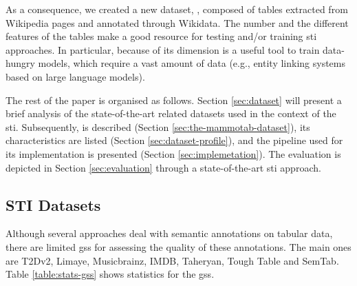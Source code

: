 As a consequence, we created a new dataset, \mammotab, composed of {} tables extracted from {} Wikipedia pages and annotated through Wikidata. The number and the different features of the tables make \mammotab a good resource for testing and/or training \ac{sti} approaches. In particular, because of its dimension \mammotab is a useful tool to train data-hungry models, which require a vast amount of data (e.g., entity linking systems based on large language models).

The rest of the paper is organised as follows. Section \ref{sec:dataset} will present a brief analysis of the state-of-the-art related datasets used in the context of the \ac{sti}. Subsequently, \mammotab is described (Section \ref{sec:the-mammotab-dataset}), its characteristics are listed (Section \ref{sec:dataset-profile}), and the pipeline used for its implementation is presented (Section \ref{sec:implemetation}). The evaluation is depicted in Section \ref{sec:evaluation} through a state-of-the-art \ac{sti} approach.

\subsection{STI Datasets}
\label{sec:dataset}

Although several approaches deal with semantic annotations on tabular data, there are limited \acp{gs} for assessing the quality of these annotations. The main ones are T2Dv2, Limaye, Musicbrainz, IMDB, Taheryan, Tough Table and SemTab. Table \ref{table:stats-gss} shows statistics for the \acp{gs}.



